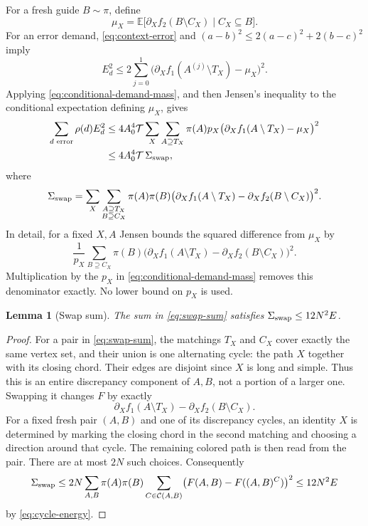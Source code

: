 \documentclass[11pt]{article}
\newtheorem{lemma}[theorem]{Lemma}
\theoremstyle{definition}
\theoremstyle{remark}
\newcommand{\E}{\mathbb E}
\newcommand{\calT}{\mathcal T}
\numberwithin{equation}{section}
\begin{document}
For a fresh guide $B\sim\pi$, define
\[
 \mu_X=\E\bigl[\partial_X f_2(B\setminus C_X)
                    \mid C_X\subseteq B\bigr].
\]
For an error demand, \eqref{eq:context-error} and
$(a-b)^2\le2(a-c)^2+2(b-c)^2$ imply
\[
 E_d^2\le 2\sum_{j=0}^1
  \bigl(\partial_X f_1(A^{(j)}\setminus T_X)-\mu_X\bigr)^2.
\]
Applying \eqref{eq:conditional-demand-mass}, and then Jensen's
inequality to the conditional expectation defining $\mu_X$, gives
\begin{align}
 \sum_{d\text{ error}}\rho(d)E_d^2
 &\le4A_0^4\calT
    \sum_X\sum_{A\supseteq T_X}\pi(A)p_X
    \bigl(\partial_X f_1(A\setminus T_X)-\mu_X\bigr)^2
       \notag\\
 &\le4A_0^4\calT\,\Sigma_{\rm swap},
 \label{eq:error-demand-load}
\end{align}
where
\begin{equation}
\label{eq:swap-sum}
 \Sigma_{\rm swap}=
 \sum_X\sum_{\substack{A\supseteq T_X\\ B\supseteq C_X}}
 \pi(A)\pi(B)
 \bigl(\partial_X f_1(A\setminus T_X)
       -\partial_X f_2(B\setminus C_X)\bigr)^2.
\end{equation}
In detail, for a fixed $X,A$ Jensen bounds the squared difference
from $\mu_X$ by
\[
 \frac1{p_X}\sum_{B\supseteq C_X}\pi(B)
 \bigl(\partial_X f_1(A\setminus T_X)
       -\partial_X f_2(B\setminus C_X)\bigr)^2.
\]
Multiplication by the $p_X$ in \eqref{eq:conditional-demand-mass}
removes this denominator exactly.  No lower bound on $p_X$ is used.

\begin{lemma}[Swap sum]
\label{lem:swap-sum}
The sum in \eqref{eq:swap-sum} satisfies $\Sigma_{\rm swap}\le12N^2E$.
\end{lemma}

\begin{proof}
For a pair in \eqref{eq:swap-sum}, the matchings $T_X$ and $C_X$
cover exactly the same vertex set, and their union is one alternating
cycle: the path $X$ together with its closing chord.  Their edges
are disjoint since $X$ is long and simple.  Thus this is an entire
discrepancy component of $A,B$, not a portion of a larger one.
Swapping it changes $F$ by exactly
\[
 \partial_X f_1(A\setminus T_X)
       -\partial_X f_2(B\setminus C_X).
\]
For a fixed fresh pair $(A,B)$ and one of its discrepancy cycles,
an identity $X$ is determined by marking the closing chord in the
second matching and choosing a direction around that cycle.  The
remaining colored path is then read from the pair.  There are at
most $2N$ such choices.  Consequently
\[
 \Sigma_{\rm swap}\le2N\sum_{A,B}\pi(A)\pi(B)
     \sum_{C\in\mathcal C(A,B)}
       \bigl(F(A,B)-F((A,B)^C)\bigr)^2
 \le12N^2E
\]
by \eqref{eq:cycle-energy}.
\end{proof}
\end{document}
